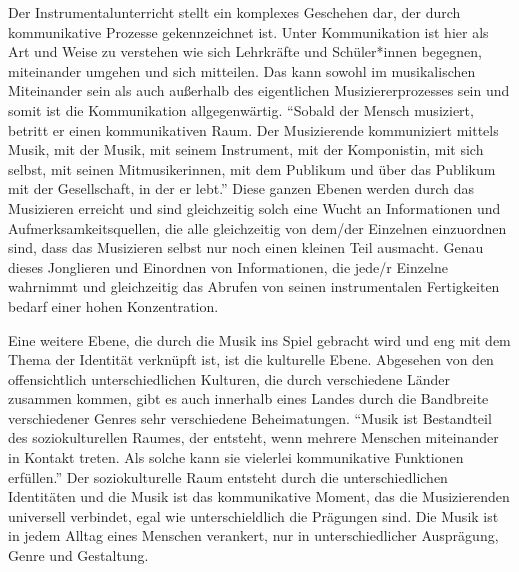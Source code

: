Der Instrumentalunterricht stellt ein komplexes Geschehen dar, der durch
kommunikative Prozesse gekennzeichnet ist. Unter Kommunikation ist hier als Art
und Weise zu verstehen wie sich Lehrkräfte und Schüler*innen begegnen,
miteinander umgehen und sich mitteilen. Das kann sowohl im musikalischen
Miteinander sein als auch außerhalb des eigentlichen Musiziererprozesses sein und
somit ist die Kommunikation allgegenwärtig. \enquote{Sobald der Mensch
musiziert, betritt er einen kommunikativen Raum. Der Musizierende kommuniziert
mittels Musik, mit der Musik, mit seinem Instrument, mit der Komponistin, mit
sich selbst, mit seinen Mitmusikerinnen, mit dem Publikum und über das Publikum
mit der Gesellschaft, in der er lebt.}
\autocite[56]{doerne:umfassend_musizieren} Diese ganzen Ebenen werden durch das
Musizieren erreicht und sind gleichzeitig solch eine Wucht an Informationen und
Aufmerksamkeitsquellen, die alle gleichzeitig von dem/der Einzelnen einzuordnen
sind, dass das Musizieren selbst nur noch einen kleinen Teil ausmacht. Genau
dieses Jonglieren und Einordnen von Informationen, die jede/r Einzelne wahrnimmt
und gleichzeitig das Abrufen von seinen instrumentalen Fertigkeiten bedarf einer
hohen Konzentration.

Eine weitere Ebene, die durch die Musik ins Spiel gebracht wird und eng mit dem
Thema der Identität verknüpft ist, ist die kulturelle Ebene. Abgesehen von den
offensichtlich unterschiedlichen Kulturen, die durch verschiedene Länder
zusammen kommen, gibt es auch innerhalb eines Landes durch die Bandbreite
verschiedener Genres sehr verschiedene Beheimatungen. \enquote{Musik ist
Bestandteil des soziokulturellen Raumes, der entsteht, wenn mehrere Menschen
miteinander in Kontakt treten. Als solche kann sie vielerlei kommunikative
Funktionen erfüllen.} \autocite[56]{doerne:umfassend_musizieren} Der
soziokulturelle Raum entsteht durch die unterschiedlichen Identitäten und die
Musik ist das kommunikative Moment, das die Musizierenden universell verbindet,
egal wie unterschieldlich die Prägungen sind. Die Musik ist in jedem Alltag
eines Menschen verankert, nur in unterschiedlicher Ausprägung, Genre und
Gestaltung.


